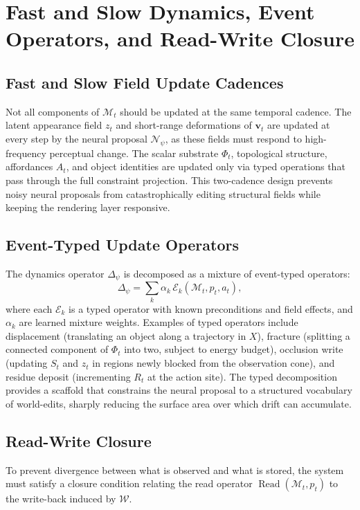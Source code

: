 \documentclass[11pt]{article}
\begin{document}
\section{Fast and Slow Dynamics, Event Operators, and Read-Write Closure}
\label{sec:fastslow}

\subsection{Fast and Slow Field Update Cadences}

Not all components of $\mathcal{M}_t$ should be updated at the same
temporal cadence.
The latent appearance field $z_t$ and short-range deformations of
$\mathbf{v}_t$ are updated at every step by the neural proposal
$\mathcal{N}_\psi$, as these fields must respond to high-frequency
perceptual change.
The scalar substrate $\Phi_t$, topological structure, affordances $A_t$,
and object identities are updated only via typed operations that pass
through the full constraint projection.
This two-cadence design prevents noisy neural proposals from catastrophically
editing structural fields while keeping the rendering layer responsive.

\subsection{Event-Typed Update Operators}

The dynamics operator $\Delta_\psi$ is decomposed as a mixture of
event-typed operators:
\[
\Delta_\psi
=
\sum_k \alpha_k\, \mathcal{E}_k(\mathcal{M}_t, p_t, a_t),
\]
where each $\mathcal{E}_k$ is a typed operator with known preconditions
and field effects, and $\alpha_k$ are learned mixture weights.
Examples of typed operators include displacement (translating an object
along a trajectory in $X$), fracture (splitting a connected component of
$\Phi_t$ into two, subject to energy budget), occlusion write (updating
$S_t$ and $z_t$ in regions newly blocked from the observation cone), and
residue deposit (incrementing $R_t$ at the action site).
The typed decomposition provides a scaffold that constrains the neural
proposal to a structured vocabulary of world-edits, sharply reducing the
surface area over which drift can accumulate.

\subsection{Read-Write Closure}

To prevent divergence between what is observed and what is stored, the
system must satisfy a closure condition relating the read operator
$\operatorname{Read}(\mathcal{M}_t, p_t)$ to the write-back induced by
$\mathcal{W}$.
\end{document}
